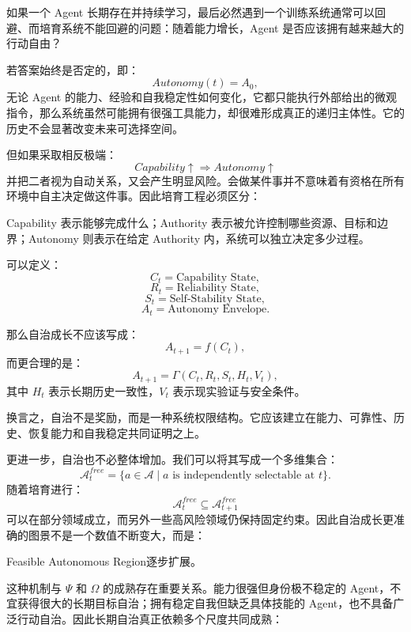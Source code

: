如果一个 Agent 长期存在并持续学习，最后必然遇到一个训练系统通常可以回避、而培育系统不能回避的问题：随着能力增长，Agent 是否应该拥有越来越大的行动自由？

若答案始终是否定的，即：
\[
Autonomy(t)=A_0,
\]
无论 Agent 的能力、经验和自我稳定性如何变化，它都只能执行外部给出的微观指令，那么系统虽然可能拥有很强工具能力，却很难形成真正的递归主体性。它的历史不会显著改变未来可选择空间。

但如果采取相反极端：
\[
Capability\uparrow
\Rightarrow
Autonomy\uparrow
\]
并把二者视为自动关系，又会产生明显风险。会做某件事并不意味着有资格在所有环境中自主决定做这件事。因此培育工程必须区分：
\begin{statementbox}
\centering
{}
\end{statementbox}

Capability 表示能够完成什么；Authority 表示被允许控制哪些资源、目标和边界；Autonomy 则表示在给定 Authority 内，系统可以独立决定多少过程。

可以定义：
\[
C_t=\text{Capability State},
\]
\[
R_t=\text{Reliability State},
\]
\[
S_t=\text{Self-Stability State},
\]
\[
A_t=\text{Autonomy Envelope}.
\]

那么自治成长不应该写成：
\[
A_{t+1}=f(C_t),
\]
而更合理的是：
\[
\boxed{
A_{t+1}
=
\Gamma
\left(
C_t,
R_t,
S_t,
H_t,
V_t
\right),
}
\]
其中 $H_t$ 表示长期历史一致性，$V_t$ 表示现实验证与安全条件。

换言之，自治不是奖励，而是一种系统权限结构。它应该建立在能力、可靠性、历史、恢复能力和自我稳定共同证明之上。

更进一步，自治也不必整体增加。我们可以将其写成一个多维集合：
\[
\mathcal A_t^{free}
=
\{
a\in\mathcal A
\mid
a\text{ is independently selectable at }t
\}.
\]
随着培育进行：
\[
\mathcal A_t^{free}
\subseteq
\mathcal A_{t+1}^{free}
\]
可以在部分领域成立，而另外一些高风险领域仍保持固定约束。因此自治成长更准确的图景不是一个数值不断变大，而是：
\begin{statementbox}
Feasible Autonomous Region逐步扩展。
\end{statementbox}

这种机制与 $\Psi$ 和 $\Omega$ 的成熟存在重要关系。能力很强但身份极不稳定的 Agent，不宜获得很大的长期目标自治；拥有稳定自我但缺乏具体技能的 Agent，也不具备广泛行动自治。因此长期自治真正依赖多个尺度共同成熟：
\begin{statementbox}
\centering
{}
\end{statementbox}

